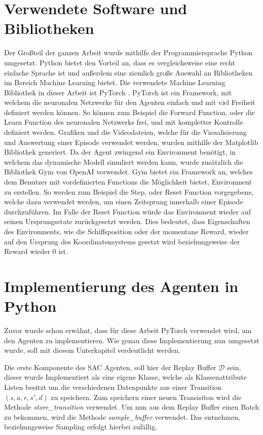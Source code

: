 \documentclass[]{iat}
\begin{document}
\section{Verwendete Software und Bibliotheken} \label{sec:software_bibs}
Der Großteil der ganzen Arbeit wurde mithilfe der Programmiersprache Python \cite[]{python} umgesetzt. Python bietet den Vorteil an, dass es vergleichsweise eine recht einfache Sprache ist und außerdem eine ziemlich große Auswahl an Bibliotheken im Bereich Machine Learning bietet. Die verwendete Machine Learning Bibliothek in dieser Arbeit ist PyTorch \cite[]{pytorch}. PyTorch ist ein Framework, mit welchem die neuronalen Netzwerke für den Agenten einfach und mit viel Freiheit definiert werden können. So können zum Beispiel die Forward Function, oder die Learn Function des neuronalen Netzwerks frei, und mit kompletter Kontrolle definiert werden. Grafiken und die Videodateien, welche für die Visualisierung und Auswertung einer Episode verwendet werden, wurden mithilfe der Matplotlib \cite[]{matpltlib} Bibliothek generiert. Da der Agent zwingend ein Environment benötigt, in welchem das dynamische Modell simuliert werden kann, wurde zusätzlich die Bibliothek Gym von OpenAI \cite[]{brockman2016openai} verwendet. Gym bietet ein Framework an, welches dem Benutzer mit vordefinierten Functions die Möglichkeit bietet, Environment zu erstellen. So werden zum Beispiel die Step, oder Reset Function vorgegebene, welche dazu verwendet werden, um einen Zeitsprung innerhalb einer Episode durchzuführen. Im Falle der Reset Function würde das Environment wieder auf seinen Ursprungsstate zurückgesetzt werden. Dies bedeutet, dass Eigenschaften des Environments, wie die Schiffsposition oder der momentane Reward, wieder auf den Ursprung des Koordinatensystems gesetzt wird beziehungsweise der Reward wieder 0 ist.
\section{Implementierung des Agenten in Python} \label{sec:imp_agent}
Zuvor wurde schon erwähnt, dass für diese Arbeit PyTorch verwendet wird, um den Agenten zu implementieren. Wie genau diese Implementierung nun umgesetzt wurde, soll mit diesem Unterkapitel verdeutlicht werden.

Die erste Komponente des SAC Agenten, soll hier der Replay Buffer $\mathcal{D}$ sein, dieser wurde Implementiert als eine eigene Klasse, welche als Klassenattribute Listen besitzt um die verschiedenen Datenpunkte aus einer Transition $(s, a, r, s', d)$ zu speichern. Zum speichern einer neuen Transisiton wird die Methode \textit{store\_transition} verwendet. Um nun aus dem Replay Buffer einen Batch zu bekommen, wird die Methode \textit{sample\_buffer} verwendet. Das entnehmen, beziehungsweise Sampling erfolgt hierbei zufällig.
\end{document}
